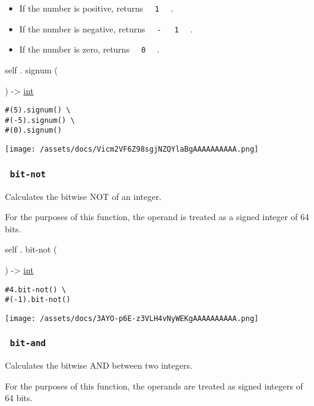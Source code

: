 \begin{itemize}
\tightlist
\item
  If the number is positive, returns
  \texttt{\ }{\texttt{\ 1\ }}\texttt{\ } .
\item
  If the number is negative, returns
  \texttt{\ }{\texttt{\ -\ }}\texttt{\ }{\texttt{\ 1\ }}\texttt{\ } .
\item
  If the number is zero, returns \texttt{\ }{\texttt{\ 0\ }}\texttt{\ }
  .
\end{itemize}

self { . } { signum } (

) -\textgreater{} \href{/docs/reference/foundations/int/}{int}

\begin{verbatim}
#(5).signum() \
#(-5).signum() \
#(0).signum()
\end{verbatim}

\texttt{[image: /assets/docs/Vicm2VF6Z98sgjNZQYlaBgAAAAAAAAAA.png]}

\subsubsection{\texorpdfstring{\texttt{\ bit-not\ }}{ bit-not }}\label{definitions-bit-not}

Calculates the bitwise NOT of an integer.

For the purposes of this function, the operand is treated as a signed
integer of 64 bits.

self { . } { bit-not } (

) -\textgreater{} \href{/docs/reference/foundations/int/}{int}

\begin{verbatim}
#4.bit-not() \
#(-1).bit-not()
\end{verbatim}

\texttt{[image: /assets/docs/3AYO-p6E-z3VLH4vNyWEKgAAAAAAAAAA.png]}

\subsubsection{\texorpdfstring{\texttt{\ bit-and\ }}{ bit-and }}\label{definitions-bit-and}

Calculates the bitwise AND between two integers.

For the purposes of this function, the operands are treated as signed
integers of 64 bits.


